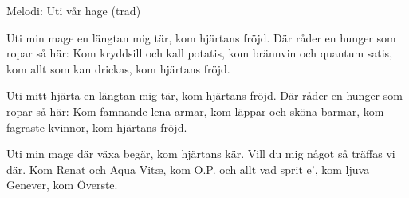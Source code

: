 \begin{song}

\begin{songmeta}
Melodi: Uti vår hage (trad)
\end{songmeta}

\begin{songtext}
Uti min mage en längtan mig tär,
kom hjärtans fröjd.
Där råder en hunger
som ropar så här:
Kom kryddsill och kall potatis,
kom brännvin och quantum satis,
kom allt som kan drickas,
kom hjärtans fröjd.

Uti mitt hjärta en längtan mig tär,
kom hjärtans fröjd.
Där råder en hunger
som ropar så här:
Kom famnande lena armar,
kom läppar och sköna barmar,
kom fagraste kvinnor,
kom hjärtans fröjd.

Uti min mage där växa begär,
kom hjärtans kär.
Vill du mig något så träffas vi där.
Kom Renat och Aqua Vitæ,
kom O.P. och allt vad sprit e',
kom ljuva Genever,
kom Överste.
\end{songtext}
\end{song}
